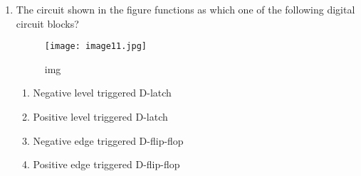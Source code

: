 \documentclass{article}
\begin{document}
\begin{enumerate}

\item  The circuit shown in the figure functions as which one of the following digital circuit blocks?
\begin{figure}[h!]
\centering
\texttt{[image: image11.jpg]}
\caption{img}
\label{fig:image1}
\end{figure}
\begin{enumerate}
\item Negative level triggered D-latch
\item Positive level triggered D-latch
\item Negative edge triggered D-flip-flop
\item Positive edge triggered D-flip-flop
\end{enumerate}
\end{enumerate}
\end{document}
